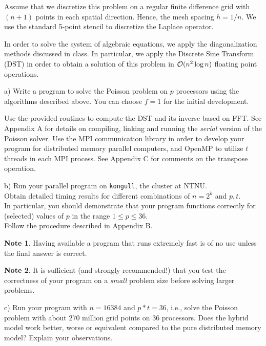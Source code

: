 \documentclass[11pt]{article}
\begin{document}
Assume that we discretize this problem on a regular finite 
difference grid with $(n+1)$ points in each spatial direction.
Hence, the mesh spacing $h=1/n$. We use the standard 5-point 
stencil to discretize the Laplace operator. 

In order to solve the system of algebraic equations, 
we apply the diagonalization methods discussed in class.
In particular, we apply the Discrete Sine Transform (DST) 
in order to obtain a solution of this problem in 
${\cal O}(n^2\log n)$ floating point operations.

\begin{description}
\item a) Write a program to solve the Poisson problem 
on $p$ processors using the algorithms described above.
You can choose $f=1$ for the initial development.

Use the provided routines to compute the DST and its inverse 
based on FFT. See Appendix A for details on compiling, linking 
and running the {\em serial} version of the Poisson solver. 
Use the MPI communication library in order to 
develop your program for distributed memory 
parallel computers, and OpenMP to utilize $t$ threads in each MPI process.
See Appendix C for comments on the transpose operation. 

\item b) Run your parallel program on \texttt{kongull}, the 
cluster at NTNU. \\Obtain detailed timing 
results for different combinations of $n = 2^k$ and $p, t$. \\
In particular, you should demonstrate that your 
program functions correctly for (selected) values of $p$ in 
the range $1 \le p\le 36$. \\
Follow the procedure described 
in Appendix B.
 
{\bf Note 1}. Having available a program that runs
extremely fast is of no use unless the final answer is correct.

{\bf Note 2}. It is sufficient 
(and strongly recommended!) that you test the correctness of 
your program on a {\em small} problem size before solving 
larger problems. 



\item c) 
Run your program with $n=16384$ and $p*t=36$,
i.e., solve the Poisson problem with about 270 million grid points on 36 processors. 
Does the hybrid model work better, worse or equivalent compared to the pure
distributed memory model? Explain your observations.


\end{description}
\end{document}

